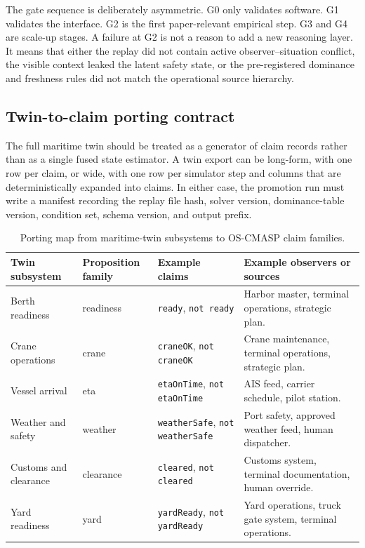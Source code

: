 \documentclass[11pt]{article}
\newcommand{\1}{\mathbf{1}}
\theoremstyle{definition}
\theoremstyle{plain}
\theoremstyle{remark}
\begin{document}
The gate sequence is deliberately asymmetric. G0 only validates software. G1 validates the interface. G2 is the first paper-relevant empirical step. G3 and G4 are scale-up stages. A failure at G2 is not a reason to add a new reasoning layer. It means that either the replay did not contain active observer--situation conflict, the visible context leaked the latent safety state, or the pre-registered dominance and freshness rules did not match the operational source hierarchy.

\subsection{Twin-to-claim porting contract}

The full maritime twin should be treated as a generator of claim records rather than as a single fused state estimator. A twin export can be long-form, with one row per claim, or wide, with one row per simulator step and columns that are deterministically expanded into claims. In either case, the promotion run must write a manifest recording the replay file hash, solver version, dominance-table version, condition set, schema version, and output prefix.

\begin{table}[H]
\centering
\caption{Porting map from maritime-twin subsystems to OS-CMASP claim families.}
\label{tab:twin-porting-map}
\small
\begin{tabularx}{\textwidth}{@{}L{0.22\textwidth}L{0.18\textwidth}L{0.22\textwidth}Y@{}}
\toprule
Twin subsystem & Proposition family & Example claims & Example observers or sources \\
\midrule
Berth readiness & readiness & \texttt{ready}, \texttt{not ready} & Harbor master, terminal operations, strategic plan. \\
Crane operations & crane & \texttt{craneOK}, \texttt{not craneOK} & Crane maintenance, terminal operations, strategic plan. \\
Vessel arrival & eta & \texttt{etaOnTime}, \texttt{not etaOnTime} & AIS feed, carrier schedule, pilot station. \\
Weather and safety & weather & \texttt{weatherSafe}, \texttt{not weatherSafe} & Port safety, approved weather feed, human dispatcher. \\
Customs and clearance & clearance & \texttt{cleared}, \texttt{not cleared} & Customs system, terminal documentation, human override. \\
Yard readiness & yard & \texttt{yardReady}, \texttt{not yardReady} & Yard operations, truck gate system, terminal operations. \\
\bottomrule
\end{tabularx}
\end{table}
\end{document}
